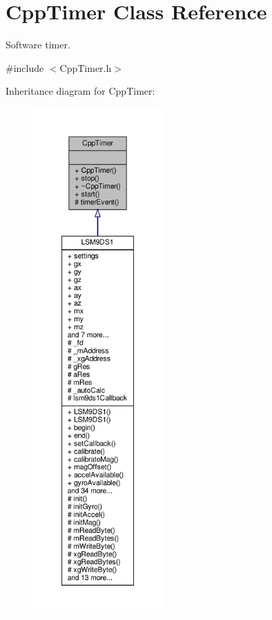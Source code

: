 \hypertarget{classCppTimer}{}\section{Cpp\+Timer Class Reference}
\label{classCppTimer}


Software timer.  




{\ttfamily \#include $<$Cpp\+Timer.\+h$>$}



Inheritance diagram for Cpp\+Timer\+:\nopagebreak
\begin{figure}[H]
\begin{center}
\leavevmode
\includegraphics[height=550pt]{classCppTimer__inherit__graph}
\end{center}
\end{figure}


